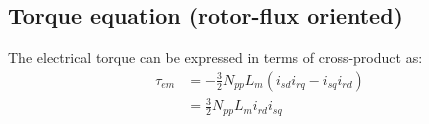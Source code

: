 \documentclass[]{book}
\begin{document}
\hypertarget{torque-equation-rotor-flux-oriented}{%
\subsection{Torque equation (rotor-flux oriented)}\label{torque-equation-rotor-flux-oriented}}

The electrical torque can be expressed in terms of cross-product as:
\[
\begin{aligned}
\tau_{em} &= - \frac{3}{2}N_{pp}L_m(i_{sd}i_{rq} -  i_{sq}i_{rd}) \\
&=  \frac{3}{2}N_{pp}L_m i_{rd}  i_{sq} \\
\end{aligned}
\label{eq:rotorFluxTorque1}
\]


\end{document}
